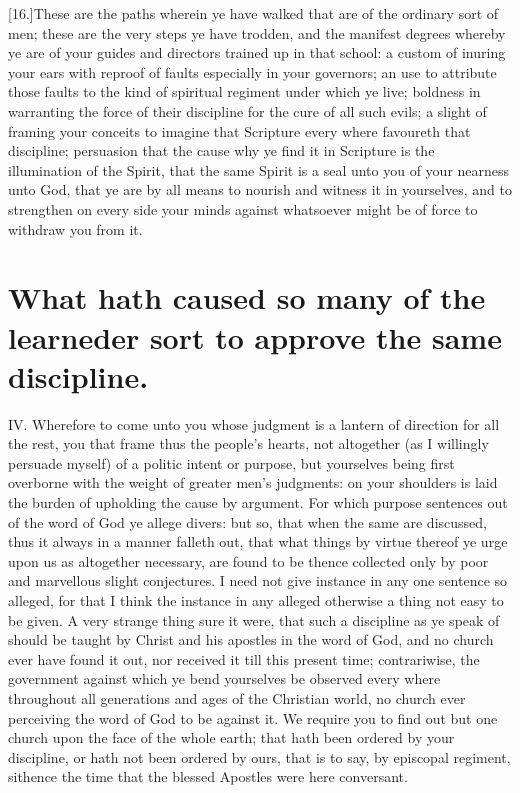 [16.]These are the paths wherein ye have walked that are of the ordinary sort of men; these are the very steps ye have trodden, and the manifest degrees whereby ye are of your guides and directors trained up in that school: a custom of inuring your ears with reproof of faults especially in your governors; an use to attribute those faults to the kind of spiritual regiment under which ye live; boldness in warranting the force of their discipline for the cure of all such evils; a slight of framing your conceits to imagine that Scripture every where favoureth that discipline; persuasion that the cause why ye find it in Scripture is the illumination of the Spirit, that the same Spirit is a seal unto you of your nearness unto God, that ye are by all means to nourish and witness it in yourselves, and to strengthen on every side your minds against whatsoever might be of force to withdraw you from it.

\section*{What hath caused so many of the learneder sort to approve the same discipline.}

IV. Wherefore to come unto you whose judgment is a lantern of direction for all the rest, you that frame thus the people’s hearts, not altogether (as I willingly persuade myself) of a politic intent or purpose, but yourselves being first overborne with the weight of greater men’s judgments: on your shoulders is laid the burden of upholding the cause by argument. For which purpose sentences out of the word of God ye allege divers: but so, that when the same are discussed, thus it always in a manner falleth out, that what things by virtue thereof ye urge upon us as altogether necessary, are found to be thence collected only by poor and marvellous slight conjectures. I need not give instance in any one sentence so alleged, for that I think the instance in any alleged otherwise a thing not easy to be given. A very strange thing sure it were, that such a discipline as ye speak of should be taught by Christ and his apostles in the word of God, and no church ever have found it out, nor received it till this present time; contrariwise, the government against which ye bend yourselves be observed every where throughout all generations and ages of the Christian world, no church ever perceiving the word of God to be against it. We require you to find out but one church upon the face of the whole earth; that hath been ordered by your discipline, or hath not been ordered by ours, that is to say, by episcopal regiment, sithence the time that the blessed Apostles were here conversant.

